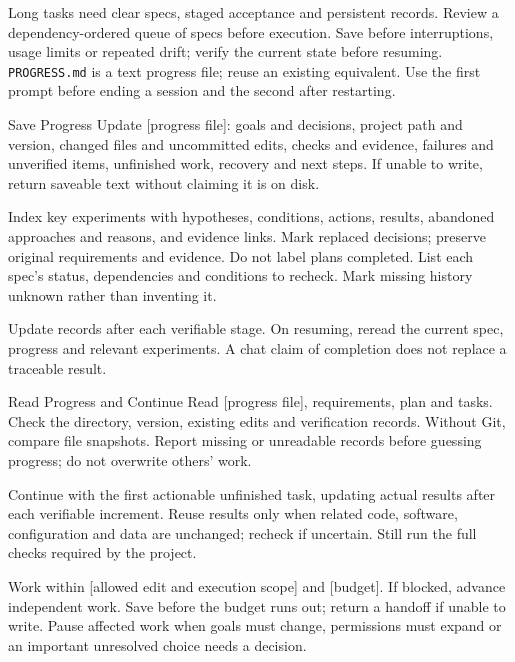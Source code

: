 Long tasks need clear specs, staged acceptance and persistent records. Review a dependency-ordered queue of specs before execution. Save before interruptions, usage limits or repeated drift; verify the current state before resuming.
\texttt{PROGRESS.md} is a text progress file; reuse an existing equivalent. Use the first prompt before ending a session and the second after restarting.
\begin{prompt}{Save Progress}
Update [progress file]: goals and decisions, project path and version, changed files and uncommitted edits, checks and evidence, failures and unverified items, unfinished work, recovery and next steps. If unable to write, return saveable text without claiming it is on disk.\par
Index key experiments with hypotheses, conditions, actions, results, abandoned approaches and reasons, and evidence links. Mark replaced decisions; preserve original requirements and evidence. Do not label plans completed. List each spec's status, dependencies and conditions to recheck. Mark missing history unknown rather than inventing it.
\end{prompt}
Update records after each verifiable stage. On resuming, reread the current spec, progress and relevant experiments. A chat claim of completion does not replace a traceable result.
\begin{prompt}{Read Progress and Continue}
Read [progress file], requirements, plan and tasks. Check the directory, version, existing edits and verification records. Without Git, compare file snapshots. Report missing or unreadable records before guessing progress; do not overwrite others' work.\par
Continue with the first actionable unfinished task, updating actual results after each verifiable increment. Reuse results only when related code, software, configuration and data are unchanged; recheck if uncertain. Still run the full checks required by the project.\par
Work within [allowed edit and execution scope] and [budget]. If blocked, advance independent work. Save before the budget runs out; return a handoff if unable to write. Pause affected work when goals must change, permissions must expand or an important unresolved choice needs a decision.
\end{prompt}
